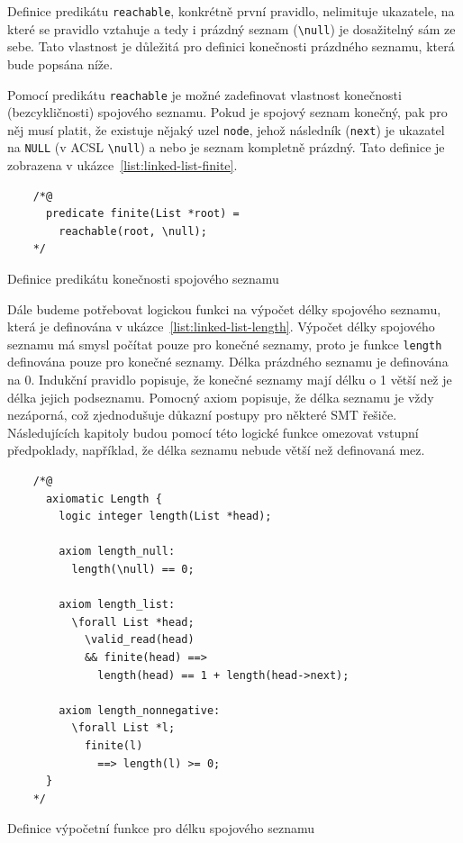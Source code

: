 Definice predikátu \texttt{reachable}, konkrétně první pravidlo,
nelimituje ukazatele, na které se pravidlo vztahuje
a tedy i prázdný seznam (\texttt{\textbackslash null}) je dosažitelný sám ze sebe.
Tato vlastnost je důležitá pro definici konečnosti prázdného seznamu, která bude popsána níže.

Pomocí predikátu \texttt{reachable} je možné zadefinovat vlastnost konečnosti (bezcykličnosti) spojového seznamu.
Pokud je spojový seznam konečný, pak pro něj musí platit,
že existuje nějaký uzel \texttt{node},
jehož následník (\texttt{next}) je ukazatel na \texttt{NULL} (v ACSL \texttt{\textbackslash null})
a nebo je seznam kompletně prázdný.
Tato definice je zobrazena v ukázce~\ref{list:linked-list-finite}.

\begin{listing}[H]
    \begin{verbatim}
    /*@
      predicate finite(List *root) =
        reachable(root, \null);
    */
    \end{verbatim}
    \caption{Definice predikátu konečnosti spojového seznamu}
    \label{list:linked-list-finite}
\end{listing}

Dále budeme potřebovat logickou funkci na výpočet délky spojového seznamu,
která je definována v ukázce~\ref{list:linked-list-length}.
Výpočet délky spojového seznamu má smysl počítat pouze pro konečné seznamy,
proto je funkce \texttt{length} definována pouze pro konečné seznamy.
Délka prázdného seznamu je definována na 0.
Indukční pravidlo popisuje, že konečné seznamy mají délku o 1 větší než je délka jejich podseznamu.
Pomocný axiom popisuje, že délka seznamu je vždy nezáporná,
což zjednodušuje důkazní postupy pro některé SMT řešiče.
Následujících kapitoly budou pomocí této logické funkce
omezovat vstupní předpoklady, například,
že délka seznamu nebude větší než definovaná mez.


\begin{listing}[H]
    \begin{verbatim}
    /*@
      axiomatic Length {
        logic integer length(List *head);

        axiom length_null:
          length(\null) == 0;

        axiom length_list:
          \forall List *head;
            \valid_read(head)
            && finite(head) ==>
              length(head) == 1 + length(head->next);

        axiom length_nonnegative:
          \forall List *l;
            finite(l)
              ==> length(l) >= 0;
      }
    */
    \end{verbatim}
    \caption{Definice výpočetní funkce pro délku spojového seznamu}
    \label{list:linked-list-length}
\end{listing}

